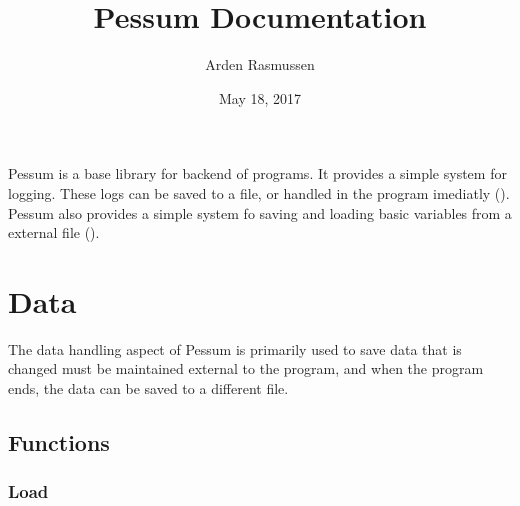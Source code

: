 \documentclass[letterpaper,10pt,english]{sphinxmanual}
\title{Pessum Documentation}
\date{May 18, 2017}
\author{Arden Rasmussen}
\begin{document}
\maketitle
\sphinxtableofcontents
{}\label{\detokenize{index::doc}}


Pessum is a base library for backend of programs. It provides a simple system
for logging. These logs can be saved to a file, or handled in the program
imediatly ({\hyperref[\detokenize{log::doc}]{}}). Pessum also provides a simple system fo saving and
loading basic variables from a external file ({\hyperref[\detokenize{data::doc}]{}}).


\chapter{Data}
\label{\detokenize{data::doc}}\label{\detokenize{data:pessum-documentation}}\label{\detokenize{data:data}}
The data handling aspect of Pessum is primarily used to save data that is
changed must be maintained external to the program, and when the program ends,
the data can be saved to a different file.


\section{Functions}
\label{\detokenize{data:functions}}

\subsection{Load}
\label{\detokenize{data:load}}
\end{document}
